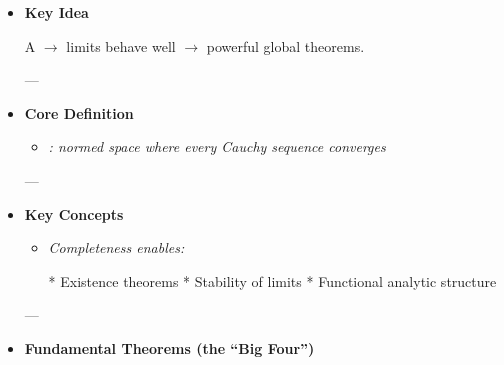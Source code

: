 \documentclass[12pt,a4paper]{report}
\begin{document}
\begin{description}
    \begin{itemize}
    \item \textbf{Key Idea}

A  $\to$ limits behave well $\to$ powerful global theorems.

---

    \item \textbf{Core Definition}

            \begin{itemize}
            \item \textit{: normed space where every Cauchy sequence converges}

            \end{itemize}
---

    \item \textbf{Key Concepts}

            \begin{itemize}
            \item \textit{Completeness enables:}

  * Existence theorems
  * Stability of limits
  * Functional analytic structure

            \end{itemize}
---

    \item \textbf{Fundamental Theorems (the “Big Four”)}

\end{itemize}
\end{description}
\end{document}
